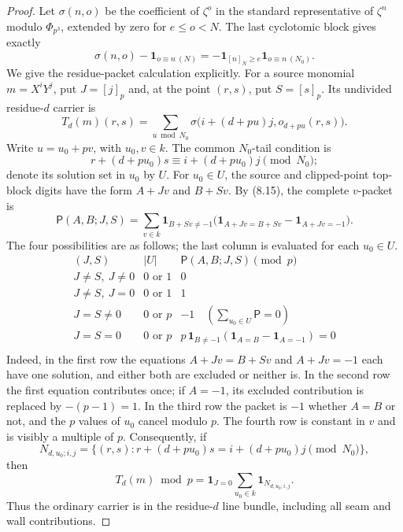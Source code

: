 \documentclass[12pt,a4paper]{article}
\theoremstyle{definition}
\begin{document}
\begin{proof}
Let $\sigma(n,o)$ be the coefficient of $\zeta^o$ in the standard
representative of $\zeta^n$ modulo $\Phi_{p^3}$, extended by zero for
$e\leq o<N$.  The last cyclotomic block gives exactly
\[
 \sigma(n,o)-\mathbf1_{o\equiv n\ (N)}
 =-\mathbf1_{[n]_N\geq e}\mathbf1_{o\equiv n\ (N_0)}.
 \tag{8.15}
\]
 We give the residue-packet calculation explicitly.  For a source monomial
 $m=X^iY^j$, put $J=[j]_p$ and, at the point $(r,s)$, put $S=[s]_p$.  Its
 undivided residue-$d$ carrier is
 \[
  T_d(m)(r,s)=\sum_{u\bmod N_0}
  \sigma\bigl(i+(d+pu)j,o_{d+pu}(r,s)\bigr).
 \tag{8.15a}
 \]
 Write $u=u_0+pv$, with $u_0,v\in k$.  The common $N_0$-tail condition is
 \[
  r+(d+pu_0)s\equiv i+(d+pu_0)j\pmod {N_0};
 \]
 denote its solution set in $u_0$ by $U$.  For $u_0\in U$, the source and
 clipped-point top-block digits have the form $A+Jv$ and $B+Sv$.  By
 (8.15), the complete $v$-packet is
 \[
  \mathsf P(A,B;J,S)=
  \sum_{v\in k}\mathbf1_{B+Sv\ne-1}
  \bigl(\mathbf1_{A+Jv=B+Sv}-\mathbf1_{A+Jv=-1}\bigr).
 \tag{8.15b}
 \]
 The four possibilities are as follows; the last column is evaluated for
 each $u_0\in U$.
 \[
 \begin{array}{c|c|c}
 (J,S)&|U|&\mathsf P(A,B;J,S)\pmod p\\ \hline
 J\ne S,\ J\ne0&0\text{ or }1&0\\
 J\ne S,\ J=0&0\text{ or }1&1\\
 J=S\ne0&0\text{ or }p&-1\quad(\sum_{u_0\in U}\mathsf P=0)\\
 J=S=0&0\text{ or }p&
 p\,\mathbf1_{B\ne-1}
 (\mathbf1_{A=B}-\mathbf1_{A=-1})=0\\
 \end{array}
 \]
 Indeed, in the first row the equations $A+Jv=B+Sv$ and $A+Jv=-1$
 each have one solution, and either both are excluded or neither is.  In the
 second row the first equation contributes once; if $A=-1$, its excluded
 contribution is replaced by $-(p-1)=1$.  In the third row the packet is
 $-1$ whether $A=B$ or not, and the $p$ values of $u_0$ cancel modulo $p$.
 The fourth row is constant in $v$ and is visibly a multiple of $p$.
 Consequently, if
 \[
  N_{d,u_0;i,j}=\{(r,s):
  r+(d+pu_0)s=i+(d+pu_0)j\pmod {N_0}\},
 \]
 then
 \[
  T_d(m)\bmod p=\mathbf1_{J=0}
  \sum_{u_0\in k}\mathbf1_{N_{d,u_0;i,j}}.
 \tag{8.15c}
 \]
 Thus the ordinary carrier is in the residue-$d$ line bundle, including all
 seam and wall contributions.


\end{proof}
\end{document}
